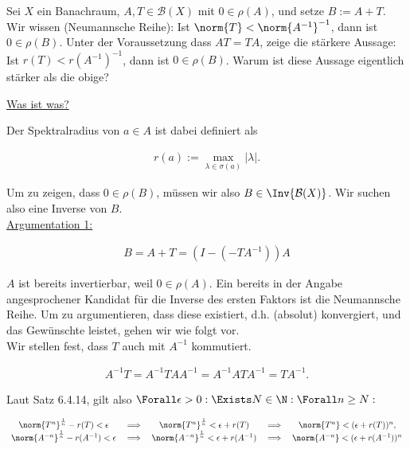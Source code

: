 \begin{exercise}[22/1]

Sei $X$ ein Banachraum, $A, T \in \mathcal{B}(X)$ mit $0 \in \rho(A)$, und setze $B := A + T$.
Wir wissen (Neumannsche Reihe):
Ist $\norm{T} < \norm{A^{-1}}^{-1}$, dann ist $0 \in \rho(B)$.
Unter der Voraussetzung dass $A T = T A$, zeige die stärkere Aussage:
Ist $r(T) < r(A^{-1})^{-1}$, dann ist $0 \in \rho(B)$.
Warum ist diese Aussage eigentlich stärker als die obige?

\end{exercise}

\begin{solution}

\underline{Was ist was?}


Der Spektralradius von $a \in A$ ist dabei definiert als

\begin{align*}
  r(a)
  :=
  \max_{\lambda \in \sigma(a)} |\lambda|.
\end{align*}

Um zu zeigen, dass $0 \in \rho(B)$, müssen wir also $B \in \Inv{\mathcal{B}(X)}$.
Wir suchen also eine Inverse von $B$. \\

\underline{Argumentation 1:}

\begin{align*}
  B
  =
  A + T
  =
  (I - (-T A^{-1})) A
\end{align*}

$A$ ist bereits invertierbar, weil $0 \in \rho(A)$.
Ein bereits in der Angabe angesprochener Kandidat für die Inverse des ersten Faktors ist die Neumannsche Reihe.
Um zu argumentieren, dass diese existiert, d.h. (absolut) konvergiert, und das Gewünschte leistet, gehen wir wie folgt vor. \\

Wir stellen fest, dass $T$ auch mit $A^{-1}$ kommutiert.

\begin{align}
    A^{-1} T
    =
    A^{-1} T A A^{-1}
    =
    A^{-1} A T A^{-1}
    = T A^{-1}.
\end{align}


Laut Satz 6.4.14, gilt also $\Forall \epsilon > 0: \Exists N \in \N: \Forall n \geq N:$

\begin{align*}
\begin{array}{ccccc}
  \norm{T^n}^\frac{1}{n} - r(T) < \epsilon &
  \implies &
  \norm{T^n}^\frac{1}{n} < \epsilon + r(T) &
  \implies &
  \norm{T^n} < (\epsilon + r(T))^n, \\
  \norm{A^{-n}}^\frac{1}{n} - r(A^{-1}) < \epsilon &
  \implies &
  \norm{A^{-n}}^\frac{1}{n} < \epsilon + r(A^{-1}) &
  \implies &
  \norm{A^{-n}} < (\epsilon + r(A^{-1}))^n
\end{array}
\end{align*}


\end{solution}
